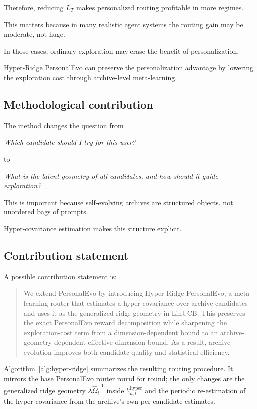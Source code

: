 \documentclass{article} %
\begin{document}
Therefore, reducing $\bar{L}_T$ makes personalized routing profitable in more
regimes.

This matters because in many realistic agent systems the routing gain may be
moderate, not huge.

In those cases, ordinary exploration may erase the benefit
of personalization.

Hyper-Ridge PersonalEvo can preserve the personalization
advantage by lowering the exploration cost through archive-level
meta-learning.

\subsection{Methodological contribution}

The method changes the question from

\begin{center}
\emph{Which candidate should I try for this user?}
\end{center}

to

\begin{center}
\emph{What is the latent geometry of all candidates, and how should it guide
exploration?}
\end{center}

This is important because self-evolving archives are structured objects, not
unordered bags of prompts.

Hyper-covariance estimation makes this structure
explicit.

\subsection{Contribution statement}

A possible contribution statement is:

\begin{quote}
We extend PersonalEvo by introducing Hyper-Ridge PersonalEvo, a meta-learning
router that estimates a hyper-covariance over archive candidates and uses it
as the generalized ridge geometry in LinUCB. This preserves the exact
PersonalEvo reward decomposition while sharpening the exploration-cost term
from a dimension-dependent bound to an archive-geometry-dependent
effective-dimension bound. As a result, archive evolution improves both
candidate quality and statistical efficiency.
\end{quote}

Algorithm~\ref{alg:hyper-ridge} summarizes the resulting routing procedure.
It mirrors the base PersonalEvo router round for round; the only changes are
the generalized ridge geometry $\lambda \widehat{\Omega}_t^{-1}$ inside
$V_{a,t}^{\mathrm{hyper}}$ and the periodic re-estimation of the
hyper-covariance from the archive's own per-candidate estimates.
\end{document}
